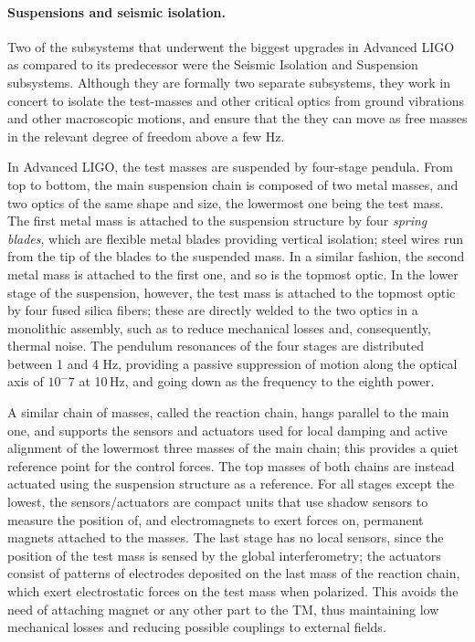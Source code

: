 \paragraph*{Suspensions and seismic isolation.}
Two of the subsystems that underwent the biggest upgrades in Advanced LIGO as compared 
to its predecessor were the Seismic Isolation and Suspension subsystems. Although they 
are formally two separate subsystems, they work in concert to isolate the test-masses and 
other critical optics from ground vibrations and other macroscopic motions, and ensure 
that the they can move as free masses in the relevant degree of freedom above a few Hz.

In Advanced LIGO, the test masses are suspended by four-stage pendula. From top to 
bottom, the main suspension chain is composed of two metal masses, and two optics 
of the same shape and size, the lowermost one being the test mass. The first metal mass 
is attached to the suspension structure by four \textit{spring blades}, which are flexible 
metal blades providing vertical isolation; steel wires run from the tip of the blades to the 
suspended mass. In a similar fashion, the second metal mass is attached to the first one, 
and so is the topmost optic. In the lower stage of the suspension, however, the test mass 
is attached to the topmost optic by four fused silica fibers; these are directly welded to 
the two optics in a monolithic assembly, such as to reduce mechanical losses and, 
consequently, thermal noise. The pendulum resonances of the four stages are 
distributed between 1 and 4 Hz, providing a passive suppression of motion along 
the optical axis of $10^-7$ at 10\,Hz, and going down as the frequency to the eighth power.

A similar chain of masses, called the reaction chain, hangs parallel to the main one, 
and supports the sensors and actuators used for local damping and active alignment 
of the lowermost three masses of the main chain; this provides a quiet reference point 
for the control forces. The top masses of both chains are instead actuated using the 
suspension structure as a reference. For all stages except the lowest, the sensors/actuators 
are compact units that use shadow sensors to measure the position of, and 
electromagnets to exert forces on, permanent magnets attached to the masses. 
The last stage has no local sensors, since the position of the test mass is sensed 
by the global interferometry; the actuators consist of patterns of electrodes 
deposited on the last mass of the reaction chain, which exert electrostatic 
forces on the test mass when polarized. This avoids the need of 
attaching magnet or any other part to the TM, thus maintaining low mechanical 
losses and reducing possible couplings to external fields.

